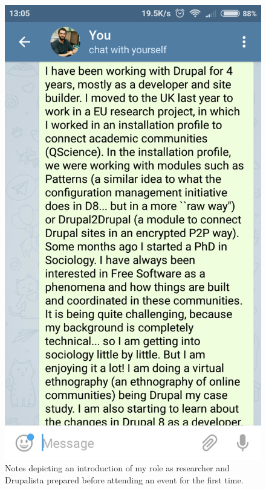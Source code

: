 \begin{figure}[H]
	\centering
	\includegraphics[scale=0.3]{img/methods/notes_telegram_introduction.png}
	\caption[Notes introducing my role as researcher and Drupalista]{Notes depicting an introduction of my role as researcher and Drupalista prepared before attending an event for the first time.}
	\label{intro_draft}
\end{figure}

